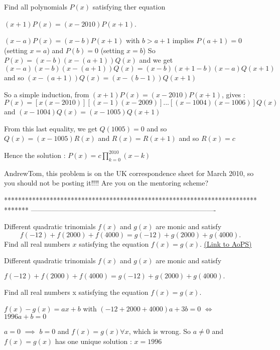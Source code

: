 \begin{solution}
	\begin{tcolorbox}Find all polynomials $ P(x)$ satisfying ther equation

$ (x + 1)P(x) = (x - 2010)P(x + 1)$.\end{tcolorbox}
$ (x-a)P(x)=(x-b)P(x+1)$ with $ b>a+1$ implies $ P(a+1)=0$ (setting $ x=a$) and $ P(b)=0$ (setting $ x=b$)
So $ P(x)=(x-b)(x-(a+1))Q(x)$ and we get $ (x-a)(x-b)(x-(a+1))Q(x)=(x-b)(x+1-b)(x-a)Q(x+1)$  and so $ (x-(a+1))Q(x)=(x-(b-1))Q(x+1)$

So a simple induction, from $ (x+1)P(x)=(x-2010)P(x+1)$, gives :
$ P(x)=[x(x-2010)][(x-1)(x-2009)]...[(x-1004)(x-1006)]Q(x)$ and $ (x-1004)Q(x)=(x-1005)Q(x+1)$

From this last equality, we get $ Q(1005)=0$ and so $ Q(x)=(x-1005)R(x)$ and $ R(x)=R(x+1)$ and so $ R(x)=c$

Hence the solution : $ \boxed{P(x)=c\prod_{k=0}^{2010}(x-k)}$
\end{solution}



\begin{solution}
	AndrewTom, this problem is on the UK correspondence sheet for March 2010, so you should not be posting it!!!! Are you on the mentoring scheme?
\end{solution}
*******************************************************************************
-------------------------------------------------------------------------------

\begin{problem}
	Different quadratic trinomials  $ f(x)$ and $ g(x)$ are monic and satisfy 
\[ f(-12) + f(2000) + f(4000)= g(-12)+g(2000)+g(4000).\]
Find all real numbers $x$ satisfying the equation $ f(x)= g(x)$.
	\flushright \href{https://artofproblemsolving.com/community/c6h339968}{(Link to AoPS)}
\end{problem}



\begin{solution}
	\begin{tcolorbox}Different quadratic trinomials  $ f(x)$ and $ g(x)$ are monic and satisfy 

$ f( - 12) + f(2000) + f(4000) = g( - 12) + g(2000) + g(4000).$


Find all real numbers x satisfying the equation $ f(x) = g(x).$\end{tcolorbox}

$ f(x) - g(x) = ax + b$  with $ ( - 12 + 2000 + 4000)a + 3b = 0$ $ \iff$ $ 1996a + b = 0$

$ a = 0$ $ \implies$ $ b = 0$ and $ f(x) = g(x) \forall x$, which is wrong. So $ a\ne 0$ and $ f(x) = g(x)$ has one unique solution : $ \boxed{x = 1996}$
\end{solution}



